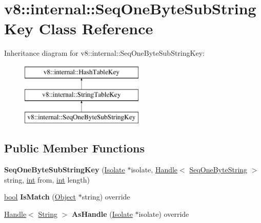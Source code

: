 \hypertarget{classv8_1_1internal_1_1SeqOneByteSubStringKey}{}\section{v8\+:\+:internal\+:\+:Seq\+One\+Byte\+Sub\+String\+Key Class Reference}
\label{classv8_1_1internal_1_1SeqOneByteSubStringKey}
Inheritance diagram for v8\+:\+:internal\+:\+:Seq\+One\+Byte\+Sub\+String\+Key\+:\begin{figure}[H]
\begin{center}
\leavevmode
\includegraphics[height=3.000000cm]{classv8_1_1internal_1_1SeqOneByteSubStringKey}
\end{center}
\end{figure}
\subsection*{Public Member Functions}
\begin{DoxyCompactItemize}
\item 
\mbox{\label{classv8_1_1internal_1_1SeqOneByteSubStringKey_a967d1e5d64829bdcb64537c71d83f8c5}} 
{\bfseries Seq\+One\+Byte\+Sub\+String\+Key} (\mbox{\hyperlink{classv8_1_1internal_1_1Isolate}{Isolate}} $\ast$isolate, \mbox{\hyperlink{classv8_1_1internal_1_1Handle}{Handle}}$<$ \mbox{\hyperlink{classv8_1_1internal_1_1SeqOneByteString}{Seq\+One\+Byte\+String}} $>$ string, \mbox{\hyperlink{classint}{int}} from, \mbox{\hyperlink{classint}{int}} length)
\item 
\mbox{\label{classv8_1_1internal_1_1SeqOneByteSubStringKey_a5c32078a90f57116e430947d99c2fce4}} 
\mbox{\hyperlink{classbool}{bool}} {\bfseries Is\+Match} (\mbox{\hyperlink{classv8_1_1internal_1_1Object}{Object}} $\ast$string) override
\item 
\mbox{\label{classv8_1_1internal_1_1SeqOneByteSubStringKey_adc10b7a626b85e261bcf75e50fc14342}} 
\mbox{\hyperlink{classv8_1_1internal_1_1Handle}{Handle}}$<$ \mbox{\hyperlink{classv8_1_1internal_1_1String}{String}} $>$ {\bfseries As\+Handle} (\mbox{\hyperlink{classv8_1_1internal_1_1Isolate}{Isolate}} $\ast$isolate) override
\end{DoxyCompactItemize}
